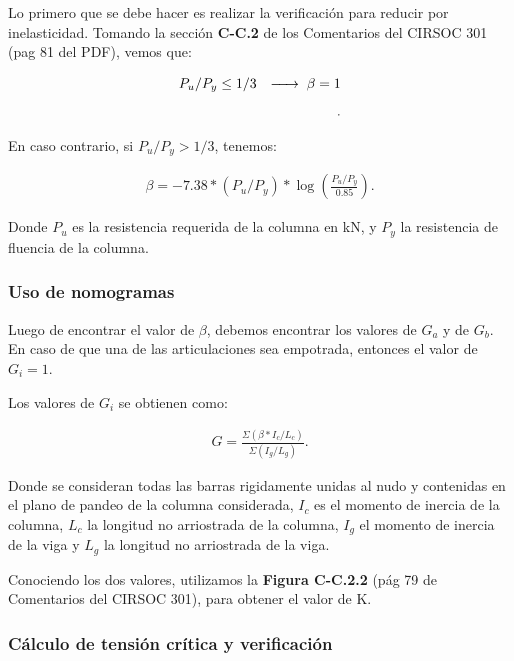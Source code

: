 \documentclass[../main.tex]{subfiles}
\begin{document}
Lo primero que se debe hacer es realizar la verificación para reducir por
inelasticidad. Tomando la sección \textbf{C-C.2} de los Comentarios del CIRSOC
301 (pag 81 del PDF), vemos que:

\begin{align*}
  P_{u} / P_{y} \leq 1/3 \hspace{0.25cm} \xrightarrow{\hspace*{0.5cm}} \hspace{0.1cm} \beta = 1 \\[5pt] 
.\end{align*}

En caso contrario, si $P_u / P_y > 1/3$, tenemos:

\begin{align*}
  \beta = -7.38 * (P_u / P_y) * \log \left( \frac{P_u / P_y}{0.85} \right) 
.\end{align*}

Donde $P_u$ es la resistencia requerida de la columna en kN, y $P_y$ la 
resistencia de fluencia de la columna.

\subsubsection{Uso de nomogramas}

Luego de encontrar el valor de $\beta$, debemos encontrar los valores de $G_a$ 
y de $G_b$. En caso de que una de las articulaciones sea empotrada, entonces el
valor de $G_i = 1$. 

Los valores de  $G_i$ se obtienen como:

 \begin{align*}
   G = \frac{\Sigma (\beta * I_c / L_c)}{\Sigma (I_g / L_g)}
.\end{align*}

Donde se consideran todas las barras rigidamente unidas al nudo y contenidas en
el plano de pandeo de la columna considerada, $I_c$ es el momento de inercia de
la columna, $L_c$ la longitud no arriostrada de la columna, $I_g$ el momento
de inercia de la  viga y $L_g$ la longitud no arriostrada de la viga.

Conociendo los dos valores, utilizamos la \textbf{Figura C-C.2.2} (pág 79 de
Comentarios del CIRSOC 301), para obtener el valor de K.

\subsubsection{Cálculo de tensión crítica y verificación}
\end{document}
